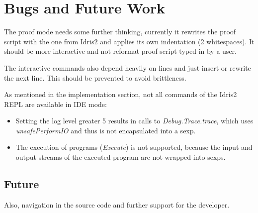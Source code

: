 \documentclass{article}
\begin{document}
\section{Bugs and Future Work}
The proof mode needs some further thinking, currently it rewrites the proof script with the one from Idris2 and applies its own indentation (2 whitespaces).
It should be more interactive and not reformat proof script typed in by a user.

The interactive commands also depend heavily on lines and just insert or rewrite the next line.
This should be prevented to avoid brittleness.

As mentioned in the implementation section, not all commands of the Idris2 REPL are available in IDE mode:
\begin{itemize}
\item Setting the log level greater 5 results in calls to \emph{Debug.Trace.trace}, which uses \emph{unsafePerformIO} and thus is not encapsulated into a sexp.
\item The execution of programs (\emph{Execute}) is not supported, because the input and output streams of the executed program are not wrapped into sexps.
\end{itemize}

\subsection{Future}

Also, navigation in the source code and further support for the developer.
\end{document}
